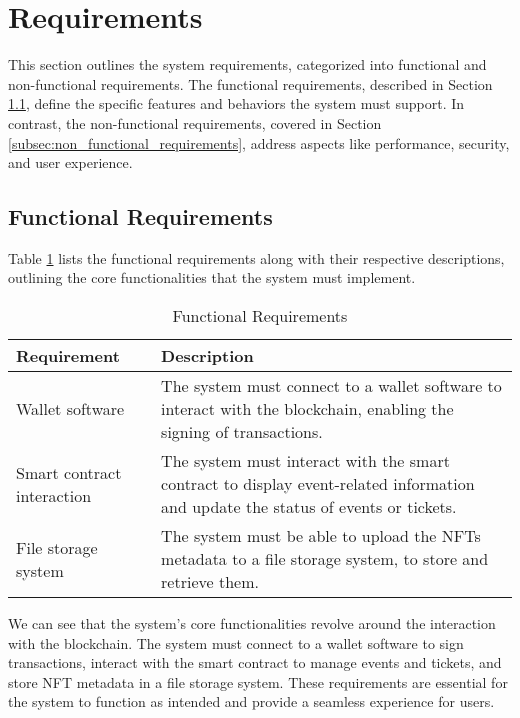 \section{Requirements}
\label{sec:requirements}

This section outlines the system requirements, categorized into functional and
non-functional requirements. The functional requirements, described in Section
\ref{subsec:functional_requirements}, define the specific features and
behaviors the system must support. In contrast, the non-functional
requirements, covered in Section \ref{subsec:non_functional_requirements},
address aspects like performance, security, and user experience.

\subsection{Functional Requirements}
\label{subsec:functional_requirements}

Table \ref{tab:functional_requirements} lists the functional requirements along
with their respective descriptions, outlining the core functionalities that the
system must implement.

\begin{table}[H]
    \caption{Functional Requirements}
    \centering
    \begin{tabularx}{\textwidth}{lX}
        \hline
        \textbf{Requirement}       & \textbf{Description}                                                                                                              \\
        \hline
        Wallet software            & The system must connect to a wallet software to interact with the blockchain, enabling the signing of transactions.               \\
        \hline
        Smart contract interaction & The system must interact with the smart contract to display event-related information and update the status of events or tickets. \\
        \hline
        File storage system        & The system must be able to upload the NFTs metadata to a file storage system, to store and retrieve them.                         \\
        \hline
    \end{tabularx}
    \label{tab:functional_requirements}
\end{table}

We can see that the system's core functionalities revolve around the
interaction with the blockchain. The system must connect to a wallet software
to sign transactions, interact with the smart contract to manage events and
tickets, and store NFT metadata in a file storage system. These requirements
are essential for the system to function as intended and provide a seamless
experience for users.


